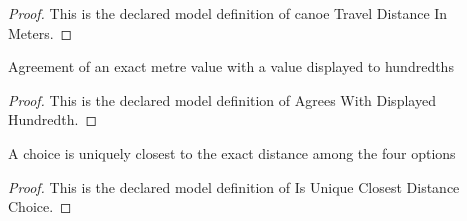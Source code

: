 \begin{proof}
  This is the declared model definition of canoe Travel Distance In Meters.
\end{proof}
\begin{definition}
  \label{def:physics:phyx-mini-0769:phyxminiproblems-problemphyxmini0769-agreeswithdisplayedhundredth}
  Agreement of an exact metre value with a value displayed to hundredths
\end{definition}
\begin{proof}
  This is the declared model definition of Agrees With Displayed Hundredth.
\end{proof}
\begin{definition}
  \label{def:physics:phyx-mini-0769:phyxminiproblems-problemphyxmini0769-isuniqueclosestdistancechoice}
  A choice is uniquely closest to the exact distance among the four options
\end{definition}
\begin{proof}
  This is the declared model definition of Is Unique Closest Distance Choice.
\end{proof}

